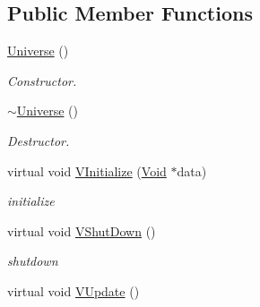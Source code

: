 \subsection*{Public Member Functions}
\begin{DoxyCompactItemize}
\item 
\hypertarget{classContent_1_1Universe_1_1Admin_1_1Universe_a8dad96f315d07487da0010e0f5ea0fdf}{
\hyperlink{classContent_1_1Universe_1_1Admin_1_1Universe_a8dad96f315d07487da0010e0f5ea0fdf}{Universe} ()}
\label{classContent_1_1Universe_1_1Admin_1_1Universe_a8dad96f315d07487da0010e0f5ea0fdf}

\begin{DoxyCompactList}\small\item\em Constructor. \item\end{DoxyCompactList}\item 
\hypertarget{classContent_1_1Universe_1_1Admin_1_1Universe_a11866e16c5ece8c7ff1d8a1a84b0e4ce}{
\hyperlink{classContent_1_1Universe_1_1Admin_1_1Universe_a11866e16c5ece8c7ff1d8a1a84b0e4ce}{$\sim$Universe} ()}
\label{classContent_1_1Universe_1_1Admin_1_1Universe_a11866e16c5ece8c7ff1d8a1a84b0e4ce}

\begin{DoxyCompactList}\small\item\em Destructor. \item\end{DoxyCompactList}\item 
\hypertarget{classContent_1_1Universe_1_1Admin_1_1Universe_a8d3599371cf502d3d63be07431a0862a}{
virtual void \hyperlink{classContent_1_1Universe_1_1Admin_1_1Universe_a8d3599371cf502d3d63be07431a0862a}{VInitialize} (\hyperlink{structVoid}{Void} $\ast$data)}
\label{classContent_1_1Universe_1_1Admin_1_1Universe_a8d3599371cf502d3d63be07431a0862a}

\begin{DoxyCompactList}\small\item\em initialize \item\end{DoxyCompactList}\item 
\hypertarget{classContent_1_1Universe_1_1Admin_1_1Universe_a6a4e50f15b647aa632a358e9cfd77499}{
virtual void \hyperlink{classContent_1_1Universe_1_1Admin_1_1Universe_a6a4e50f15b647aa632a358e9cfd77499}{VShutDown} ()}
\label{classContent_1_1Universe_1_1Admin_1_1Universe_a6a4e50f15b647aa632a358e9cfd77499}

\begin{DoxyCompactList}\small\item\em shutdown \item\end{DoxyCompactList}\item 
\hypertarget{classContent_1_1Universe_1_1Admin_1_1Universe_ad26b44de2814a08668ee27322b049c8c}{
virtual void \hyperlink{classContent_1_1Universe_1_1Admin_1_1Universe_ad26b44de2814a08668ee27322b049c8c}{VUpdate} ()}
\label{classContent_1_1Universe_1_1Admin_1_1Universe_ad26b44de2814a08668ee27322b049c8c}


\end{DoxyCompactItemize}
